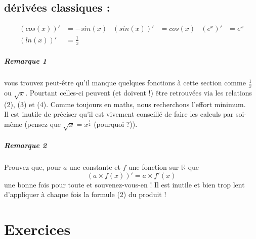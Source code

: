 \documentclass[11pt]{article}
\newcommand{\R}{\mathbb R}
\newcommand{\de}[1]{\left(#1\right)'}
\begin{document}
        \subsection{dérivées classiques :}
        \begin{align*}
            \de{cos(x)} &= -sin(x) &\de{sin(x)} &= cos(x) & \de{e^x} &= e^x \\
            \de{ln(x)} &= \frac{1}{x} 
        \end{align*}
        \subparagraph{Remarque 1} vous trouvez peut-être qu'il manque quelques fonctions à cette section comme $\frac{1}{x}$ ou $\sqrt{x}$. Pourtant celles-ci peuvent (et doivent !) être retrouvées via les relations (2), (3) et (4). Comme toujours en maths, nous recherchons l'effort minimum.\\
        Il est inutile de préciser qu'il est vivement conseillé de faire les calculs par soi-même (pensez que $\sqrt{x} = x^{\frac{1}{2}}$ (pourquoi ?)).
        \subparagraph{Remarque 2} Prouvez que, pour $a$ une constante et $f$ une fonction sur $\R$ que
        \begin{equation*}
         \de{a\times f(x)} = a\times f'(x) 
        \end{equation*}
         une bonne fois pour toute et souvenez-vous-en ! Il est inutile et bien trop lent d'appliquer à chaque fois la formule (2) du produit !  

    \section{Exercices}
\end{document}
